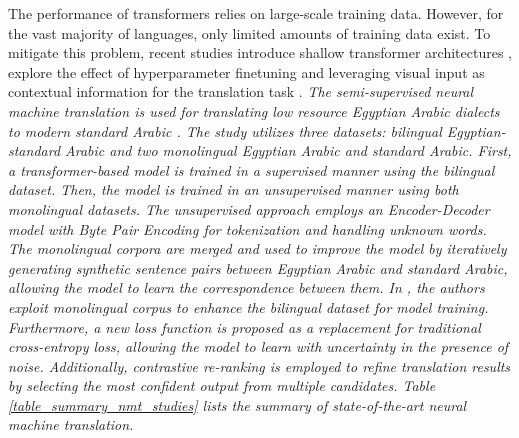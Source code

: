 \documentclass[preprint,12pt]{elsarticle}
\begin{document}
The performance of transformers relies on large-scale training data. However, for the vast majority of languages, only limited amounts of training data exist. To mitigate this problem, recent studies introduce shallow transformer architectures \citep{gezmu_transformers_2022}, explore the effect of hyperparameter finetuning \citep{araabi_optimizing_2020} and leveraging visual input as contextual information for the translation task \citep{meetei_cues_2023}. \emph{The semi-supervised neural machine translation is used for translating low resource Egyptian Arabic dialects to modern standard Arabic \citep{faheem_improving_2024}. The study utilizes three datasets: bilingual Egyptian-standard Arabic and two monolingual Egyptian Arabic and standard Arabic. First, a transformer-based model is trained in a supervised manner using the bilingual dataset. Then, the model is trained in an unsupervised manner using both monolingual datasets. The unsupervised approach employs an Encoder-Decoder model with Byte Pair Encoding for tokenization and handling unknown words. The monolingual corpora are merged and used to improve the model by iteratively generating synthetic sentence pairs between Egyptian Arabic and standard Arabic, allowing the model to learn the correspondence between them. In \citep{li_towards_2024}, the authors exploit monolingual corpus to enhance the bilingual dataset for model training. Furthermore, a new loss function is proposed as a replacement for traditional cross-entropy loss, allowing the model to learn with uncertainty in the presence of noise. Additionally, contrastive re-ranking is employed to refine translation results by selecting the most confident output from multiple candidates. Table \ref{table_summary_nmt_studies} lists the summary of state-of-the-art neural machine translation.}
\end{document}
